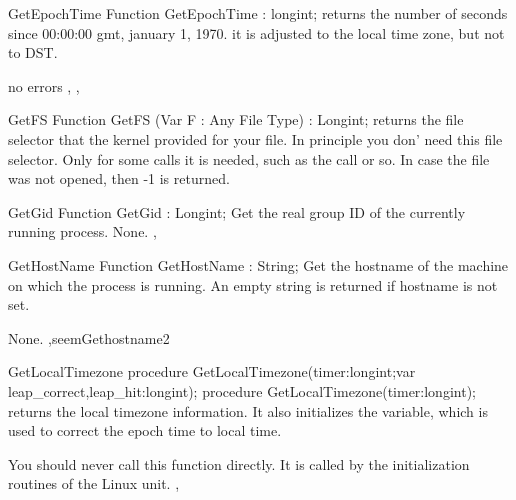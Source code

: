 
\begin{function}{GetEpochTime}
\Declaration
Function GetEpochTime  : longint;
\Description
returns the number of seconds since 00:00:00 gmt, january 1, 1970.
it is adjusted to the local time zone, but not to DST.

\Errors
no errors
\SeeAlso
{}, , 
\end{function}


\begin{function}{GetFS}
\Declaration
Function GetFS (Var F : Any File Type) : Longint;
\Description
{} returns the file selector that the kernel provided for your
file. In principle you don' need this file selector. Only for some calls
it is needed, such as the  call or so.
\Errors
In case the file was not opened, then -1 is returned.
\SeeAlso
{}
\end{function}


\begin{function}{GetGid}
\Declaration
Function GetGid  : Longint;
\Description
 Get the real group ID of the currently running process.
\Errors
None.
\SeeAlso
{},  
\end{function}


\begin{function}{GetHostName}
\Declaration
Function GetHostName  : String;
\Description
Get the hostname of the machine on which the process is running.
An empty string is returned if hostname is not set.

\Errors
None.
\SeeAlso
 ,seem{Gethostname}{2} 
\end{function}


\begin{procedure}{GetLocalTimezone}
\Declaration
procedure GetLocalTimezone(timer:longint;var leap\_correct,leap\_hit:longint);
procedure GetLocalTimezone(timer:longint);
\Description
{} returns the local timezone information. It also
initializes the  variable, which is used to correct the epoch time
to local time. 

You should never call this function directly. It is called by the
initialization routines of the Linux unit.
\SeeAlso
{}, 
\end{procedure}

